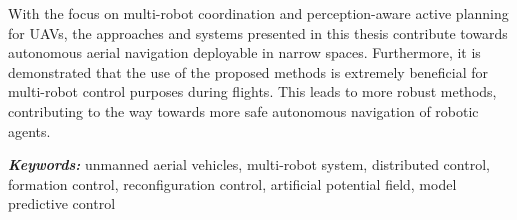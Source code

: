 With the focus on multi-robot coordination and perception-aware active planning for UAVs, the approaches and systems presented in this thesis contribute towards autonomous aerial navigation deployable in narrow spaces. Furthermore, it is demonstrated that the use of the proposed methods is extremely beneficial for multi-robot control purposes during flights. This leads to more robust methods, contributing to the way towards more safe autonomous navigation of robotic agents.

\noindent\textbf{\textit{Keywords:}}
unmanned aerial vehicles, multi-robot system, distributed control, formation control, reconfiguration control, artificial potential field, model predictive control